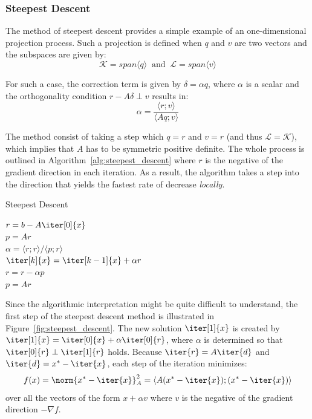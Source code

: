\subsubsection{Steepest Descent}
\label{sec:steepest_descent}

The method of steepest descent provides a simple example of an one-dimensional projection process. Such a projection is defined when $q$ and $v$ are two vectors and the subspaces are given by:
\begin{equation}
    \mathcal{K}=span\langle q\rangle\;\; \text{and} \;\; \mathcal{L}=span\langle v\rangle
\end{equation}

\noindent For such a case, the correction term is given by $\delta=\alpha q$, where $\alpha$ is a scalar and the orthogonality condition $r-A\delta \perp v$ results in:
\begin{equation}
    \alpha = \frac{\langle r;v\rangle}{\langle Aq;v\rangle}
\end{equation}

\noindent The method consist of taking a step which $q=r$ and $v=r$ (and thus $\mathcal{L}=\mathcal{K}$), which implies that $A$ has to be symmetric positive definite. The whole process is outlined in  Algorithm~\hyperref[alg:steepest_descent]{\ref{alg:steepest_descent}} where $r$ is the negative of the gradient direction in each iteration. As a result, the algorithm takes a step into the direction that yields the fastest rate of decrease \textit{locally}.

\begin{algorithm}[h]
  \caption{Steepest Descent}
  \label{alg:steepest_descent}
  \SetAlgoLined
  \DontPrintSemicolon
  $r = b-A\iter[0]{x}$ \\
  $p = Ar$ \\
   {
    $\alpha = \langle r;r \rangle / \langle p;r \rangle$ \\
    $\iter[k]{x} = \iter[k-1]{x}+\alpha r$ \\
    $r = r - \alpha p$ \\
    $p = Ar$ \\
  }
\end{algorithm}

\noindent Since the algorithmic interpretation might be quite difficult to understand, the first step of the steepest descent method is illustrated in Figure~\hyperref[fig:steepest_descent]{\ref{fig:steepest_descent}}. The new solution $\iter[1]{x}$ is created by $\iter[1]{x}=\iter[0]{x}+\alpha \iter[0]{r}$, where $\alpha$ is determined so that $\iter[0]{r} \perp \iter[1]{r}$ holds. Because $\iter{r}=A\iter{d}$ and $\iter{d}=x^*-\iter{x}$, each step of the iteration minimizes:
\begin{equation}
f(x) = \norm{x^*-\iter{x}}_A^2 = \langle A(x^*-\iter{x});(x^*-\iter{x})\rangle
\end{equation}
\noindent over all the vectors of the form $x+\alpha v$ where $v$ is the negative of the gradient direction $-\nabla f$.

